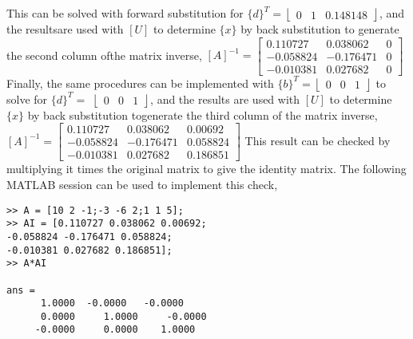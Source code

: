 \documentclass[../main.tex]{subfiles}
\begin{document}
\bigbreak
This can be solved with forward substitution for $\{d\}^{T}=\left\lfloor\begin{array}{lll}0 & 1 & 0.148148\end{array}\right\rfloor$, and the results\smallbreak are used with $[U]$ to determine $\{x\}$ by back substitution to generate the second column of\smallbreak the matrix inverse,
\bigbreak
$[A]^{-1}=\left[\begin{array}{ccc}
0.110727 & 0.038062 & 0 \\
-0.058824 & -0.176471 & 0 \\
-0.010381 & 0.027682 & 0
\end{array}\right]$
\bigbreak
Finally, the same procedures can be implemented with $\{b\}^{T}=\left\lfloor\begin{array}{lll}0 & 0 & 1\end{array}\right\rfloor$ to solve for $\{d\}^{T}=$ \smallbreak$\left\lfloor\begin{array}{lll}0 & 0 & 1\end{array}\right\rfloor$, and the results are used with $[U]$ to determine $\{x\}$ by back substitution to\smallbreak generate the third column of the matrix inverse,
\bigbreak
$[A]^{-1}=\left[\begin{array}{ccc}
0.110727 & 0.038062 & 0.00692 \\
-0.058824 & -0.176471 & 0.058824 \\
-0.010381 & 0.027682 & 0.186851
\end{array}\right]$
\bigbreak
This result can be checked by multiplying it times the original matrix to give the identity \smallbreak matrix. The following MATLAB session can be used to implement this check,
\bigbreak
\begin{lstlisting}[numbers=none]	 	 
>> A = [10 2 -1;-3 -6 2;1 1 5];
>> AI = [0.110727 0.038062 0.00692;
-0.058824 -0.176471 0.058824;
-0.010381 0.027682 0.186851];
>> A*AI

ans =
	  1.0000  -0.0000 	-0.0000
	  0.0000 	 1.0000 	-0.0000
 	 -0.0000	 0.0000	   1.0000
\end{lstlisting}
\bigbreak


\section{}
\end{document}

